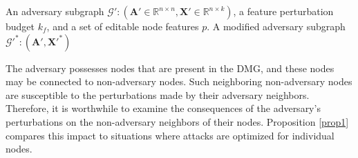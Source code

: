 \documentclass[conference,compsoc]{IEEEtran}
\begin{document}
\begin{algorithm}[t!]
\caption{MintA-feature perturbation.}
\label{Algorithm1}
\begin{algorithmic}[1]{
\renewcommand{\algorithmicrequire}{\textbf{Input:}} 
\renewcommand{\algorithmicensure}{\textbf{Output:}}
\REQUIRE An adversary subgraph $\mathcal{G'}:(\boldsymbol{A'} \in \mathbb{R}^{n \times n},\boldsymbol{X'} \in \mathbb{R}^{n \times k})$, a feature perturbation budget $k_f$, and a set of editable node features $p$.
\ENSURE A modified adversary subgraph $\mathcal{G'}^*:(\boldsymbol{A'},\boldsymbol{X'}^*)$ 
}
\end{algorithmic}
\end{algorithm}


\par The adversary possesses nodes that are present in the DMG, and these nodes may be connected to non-adversary nodes. Such neighboring non-adversary nodes are susceptible to the perturbations made by their adversary neighbors. Therefore, it is worthwhile to examine the consequences of the adversary's perturbations on the non-adversary neighbors of their nodes. Proposition \ref{prop1} compares this impact to situations where attacks are optimized for individual nodes.
\end{document}
